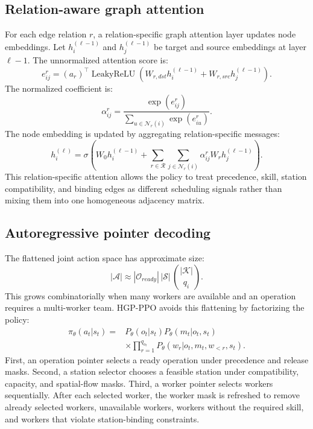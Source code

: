 \subsection{Relation-aware graph attention}

For each edge relation $r$, a relation-specific graph attention layer updates node embeddings. Let $h_i^{(\ell-1)}$ and $h_j^{(\ell-1)}$ be target and source embeddings at layer $\ell-1$. The unnormalized attention score is:
\begin{equation}
  e_{ij}^{r}
  =
  (a_r)^\top
  \operatorname{LeakyReLU}
  \left(
  W_{r,dst}h_i^{(\ell-1)}
  +
  W_{r,src}h_j^{(\ell-1)}
  \right).
\end{equation}
The normalized coefficient is:
\begin{equation}
  \alpha_{ij}^{r}
  =
  \frac{\exp(e_{ij}^{r})}
  {\sum_{u\in\mathcal{N}_r(i)}\exp(e_{iu}^{r})}.
\end{equation}
The node embedding is updated by aggregating relation-specific messages:
\begin{equation}
  h_i^{(\ell)}
  =
  \sigma
  \left(
  W_0h_i^{(\ell-1)}
  +
  \sum_{r\in\mathcal{R}}\sum_{j\in\mathcal{N}_r(i)}
  \alpha_{ij}^{r}W_rh_j^{(\ell-1)}
  \right).
\end{equation}
This relation-specific attention allows the policy to treat precedence, skill, station compatibility, and binding edges as different scheduling signals rather than mixing them into one homogeneous adjacency matrix.

\subsection{Autoregressive pointer decoding}

The flattened joint action space has approximate size:
\begin{equation}
  |\mathcal{A}| \approx |\mathcal{O}_{ready}|\,|\mathcal{S}|\,\binom{|\mathcal{K}|}{q_i}.
\end{equation}
This grows combinatorially when many workers are available and an operation requires a multi-worker team. HGP-PPO avoids this flattening by factorizing the policy:
\begin{equation}
\begin{split}
  \pi_\theta(a_t|s_t)
  ={}& P_\theta(o_t|s_t)
  P_\theta(m_t|o_t,s_t)\\
  &\times
  \prod_{r=1}^{q_{o_t}}
  P_\theta(w_r|o_t,m_t,w_{<r},s_t).
\end{split}
\end{equation}
First, an operation pointer selects a ready operation under precedence and release masks. Second, a station selector chooses a feasible station under compatibility, capacity, and spatial-flow masks. Third, a worker pointer selects workers sequentially. After each selected worker, the worker mask is refreshed to remove already selected workers, unavailable workers, workers without the required skill, and workers that violate station-binding constraints.


